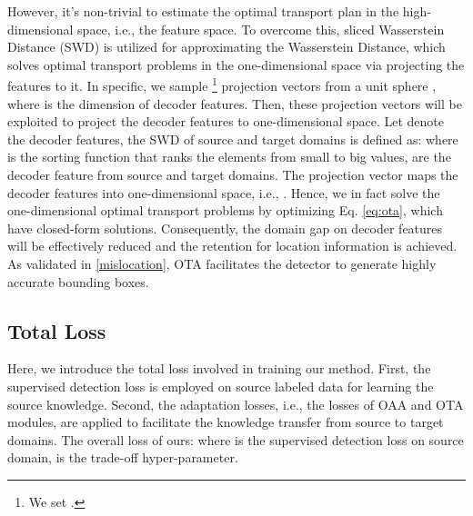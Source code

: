 \documentclass[sigconf]{acmart}
\begin{document}
However, it's non-trivial to estimate the optimal transport plan  in the high-dimensional space, i.e., the feature space. To overcome this, sliced Wasserstein Distance (SWD) is utilized \cite{Wasserstein} for approximating the Wasserstein Distance, which solves optimal transport problems in the one-dimensional space via projecting the features to it. In specific, we sample \footnote{We set .} projection vectors from a unit sphere , where  is the dimension of decoder features. Then, these projection vectors will be exploited to project the decoder features to one-dimensional space. Let  denote the decoder features, the SWD of source and target domains is defined as:
where  is  the sorting function that ranks the elements from small to big values,  are the  decoder feature from source and target domains. The projection vector  maps the decoder features into one-dimensional space, i.e., . Hence, we in fact solve the one-dimensional optimal transport problems by optimizing Eq. \eqref{eq:ota}, which have closed-form solutions. Consequently, the domain gap on decoder features will be effectively reduced and the retention for location information is achieved. As validated in \ref{mislocation}, OTA facilitates the detector to generate highly accurate bounding boxes.


\subsection{Total Loss}
Here, we introduce the total loss involved in training our method. First, the supervised detection loss is employed on source labeled data for learning the source knowledge. Second, the adaptation losses, i.e., the losses of OAA and OTA modules, are applied to facilitate the knowledge transfer from source to target domains. The overall loss of ours:
where  is the supervised detection loss on source domain,  is the trade-off hyper-parameter. 
\end{document}
